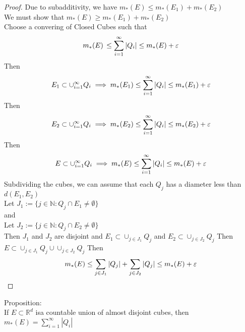 \documentclass{article}[12 pt]
\begin{document}
\begin{enumerate}
	      \begin{proof}
		      Due to subadditivity, we have $m_{*}(E) \leq m_{*}(E_1) + m_{*}(E_2)$\\
		      We must show that $m_{*}(E) \geq m_{*}(E_1) + m_{*}(E_2)$\\
		      Choose a convering of Closed Cubes such that
		      \begin{equation}
			      m_{*}(E)\, \leq \sum_{i=1}^{\infty}|Q_i| \leq m_{*}(E) + \varepsilon\\
		      \end{equation}
		      Then
		      \begin{equation}
			      E_1 \subset \cup_{i=1}^{\infty}Q_i \implies m_{*}(E_1) \leq \sum_{i=1}^{\infty}|Q_i| \leq m_{*}(E_1) + \varepsilon\\
		      \end{equation}
		      Then
		      \begin{equation}
			      E_2 \subset \cup_{i=1}^{\infty}Q_i \implies m_{*}(E_2) \leq \sum_{i=1}^{\infty}|Q_i| \leq m_{*}(E_2) + \varepsilon\\
		      \end{equation}
		      Then
		      \begin{equation}
			      E \subset \cup_{i=1}^{\infty}Q_i \implies m_{*}(E) \leq \sum_{i=1}^{\infty}|Q_i| \leq m_{*}(E) + \varepsilon\\
		      \end{equation}
		      Subdividing the cubes, we can assume that each $Q_j$ has a diameter less than $d(E_1,E_2)$\\
		      Let $J_1 := \{j \in \mathbb{N}: Q_j \cap E_1 \neq \emptyset\}$\\
		      and \\
		      Let $J_2 := \{j \in \mathbb{N}: Q_j \cap E_2 \neq \emptyset\}$\\
		      Then $J_1$ and $J_2$ are disjoint and $E_1 \subset \cup_{j\in J_1}Q_j$ and $E_2 \subset \cup_{j\in J_2}Q_j$
		      Then $E \subset \cup_{j\in J_1}Q_j \cup \cup_{j\in J_2}Q_j$
		      Then
		      \begin{equation}
			      m_{*}(E) \leq \sum_{j\in J_1}|Q_j| + \sum_{j\in J_2}|Q_j| \leq m_{*}(E) + \varepsilon\\
		      \end{equation}
	      \end{proof}
	      Proposition:\\
	      If $E \subset \mathbb{R}^d$ isa countable union of almost disjoint cubes, then $m_{*}(E) = \sum_{i=1}^{\infty}|Q_i|$\\

\end{enumerate}
\end{document}
